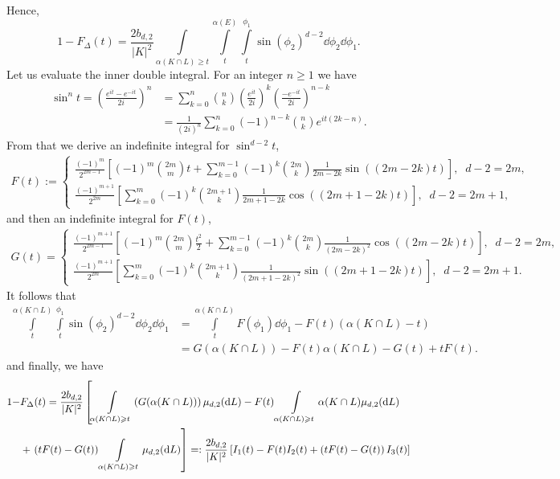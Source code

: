 \documentclass[12pt, reqno]{amsart}
\begin{document}
Hence, 
$$
    1 - F_{\Delta}(t) = \frac{2b_{d,2}}{|K|^2}\int\limits_{\alpha(K \cap L) \geqslant t}\int\limits_t^{\alpha(E)}\int\limits_t^{\phi_1}\sin(\phi_2)^{d-2} \dd \phi_2 \dd \phi_1.
$$
Let us evaluate the inner double integral. For an integer $n\geq 1$ we have
\begin{align*}
    \sin^n t = \left(\frac{e^{it} - e^{-it}}{2i}\right)^n &= \sum_{k = 0}^n \binom{n}{k}\left(\frac{e^{it}}{2i}\right)^k\left(\frac{-e^{-it}}{2i}\right)^{n-k}
    \\
    &= \frac{1}{(2i)^n}\sum_{k = 0}^n (-1)^{n-k}\binom{n}{k}e^{it(2k - n)}.
\end{align*}
From that we derive an indefinite integral for $ \sin^{d-2}t$,
\begin{align*}
    F(t) :=
    \begin{cases}
         \frac{(-1)^m}{2^{2m-1}}\left[(-1)^m\binom{2m}{m}t + \sum_{k = 0}^{m-1}(-1)^k\binom{2m}{k}\frac{1}{2m - 2k}\sin((2m - 2k)t)\right], \;\; d-2 = 2m, \\
         \frac{(-1)^{m+1}}{2^{2m}}\left[\sum_{k = 0}^{m}(-1)^k\binom{2m+1}{k}\frac{1}{2m + 1 - 2k}\cos((2m + 1 - 2k)t)\right], \;\; d-2 = 2m + 1,
    \end{cases}
\end{align*}
and then an indefinite integral for $F(t)$,
\begin{align*}
    G(t) =
    \begin{cases}
    \frac{(-1)^{m+1}}{2^{2m-1}}\left[(-1)^m\binom{2m}{m}\frac{t^2}{2} + \sum_{k = 0}^{m-1}(-1)^{k}\binom{2m}{k}\frac{1}{(2m - 2k)^2}\cos((2m - 2k)t)\right], \;\; d-2 = 2m, \\
    \frac{(-1)^{m+1}}{2^{2m}}\left[\sum_{k = 0}^{m}(-1)^k\binom{2m+1}{k}\frac{1}{(2m + 1 - 2k)^2}\sin((2m + 1 - 2k)t)\right], \;\; d-2 = 2m + 1.
    \end{cases}
\end{align*}
It follows that
\begin{align*}
    \int\limits_t^{\alpha(K \cap L)}\int\limits_t^{\phi_1}\sin(\phi_2)^{d-2} \dd \phi_2\dd \phi_1 &= \int\limits_t^{\alpha(K \cap L)} F(\phi_1) \dd \phi_1  - F(t)(\alpha(K \cap L) - t) \\
    &= G(\alpha(K \cap L)) - F(t)\alpha(K \cap L) - G(t) + tF(t).
\end{align*}
and finally, we have
\begin{align}\notag
    1 - &F_{\Delta}(t) = \frac{2b_{d,2}}{|K|^2} \left[\int\limits_{\alpha(K \cap L)\geqslant t}\left(G(\alpha(K \cap L))\right) \mu_{d,2}(\mathrm{d}L) -F(t)\int\limits_{\alpha(K \cap L) \geqslant t}\alpha(K \cap L)\mu_{d,2}(\mathrm{d}L) \right. \\\label{whole}
     &+\left. \left( tF(t) - G(t) \right)\int\limits_{\alpha(K \cap L) \geqslant t}\mu_{d,2}(\mathrm{d}L)\right] =:\frac{2b_{d,2}}{|K|^2}\left[ I_1(t) -  F(t) I_2(t) + \left( tF(t) - G(t) \right)I_3(t)\right]
\end{align}
\end{document}
